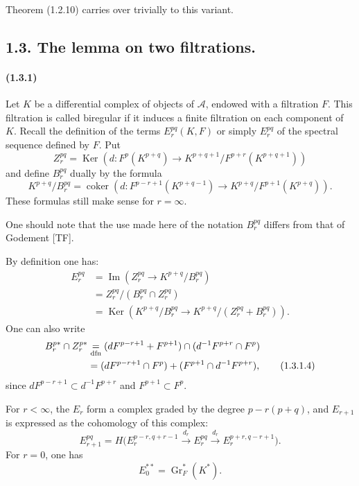 \documentclass[10pt]{article}
\newcommand{\Gr}{\operatorname{Gr}}
\newcommand{\Ker}{\operatorname{Ker}}
\newcommand{\Imop}{\operatorname{Im}}
\newcommand{\coker}{\operatorname{coker}}
\newcommand{\calA}{\mathcal A}
\begin{document}
Theorem (1.2.10) carries over trivially to this variant.

\subsection*{1.3. The lemma on two filtrations.}

\paragraph{(1.3.1)} Let $K$ be a differential complex of objects of $\calA$, endowed with a filtration $F$. This filtration is called biregular if it induces a finite filtration on each component of $K$. Recall the definition of the terms $E_r^{pq}(K,F)$ or simply $E_r^{pq}$ of the spectral sequence defined by $F$. Put
\[
Z_r^{pq}=\Ker\left(d:F^p(K^{p+q})\to K^{p+q+1}/F^{p+r}(K^{p+q+1})\right)
\]
and define $B_r^{pq}$ dually by the formula
\[
K^{p+q}/B_r^{pq}=\coker\left(d:F^{p-r+1}(K^{p+q-1})\to K^{p+q}/F^{p+1}(K^{p+q})\right).
\]
These formulas still make sense for $r=\infty$.

One should note that the use made here of the notation $B_r^{pq}$ differs from that of Godement [TF].

By definition one has:
\begin{align}
E_r^{pq}&=\Imop\left(Z_r^{pq}\to K^{p+q}/B_r^{pq}\right) \tag{1.3.1.1}\\
&=Z_r^{pq}/(B_r^{pq}\cap Z_r^{pq}) \tag{1.3.1.2}\\
&=\Ker\left(K^{p+q}/B_r^{pq}\to K^{p+q}/(Z_r^{pq}+B_r^{pq})\right). \tag{1.3.1.3}
\end{align}
One can also write
\begin{align}
B_r^{p*}\cap Z_r^{p*}
&\underset{\mathrm{dfn}}{=}(dF^{p-r+1}+F^{p+1})\cap(d^{-1}F^{p+r}\cap F^p) \notag\\
&=(dF^{p-r+1}\cap F^p)+(F^{p+1}\cap d^{-1}F^{p+r}), \tag{1.3.1.4}
\end{align}
since $dF^{p-r+1}\subset d^{-1}F^{p+r}$ and $F^{p+1}\subset F^p$.


For $r<\infty$, the $E_r$ form a complex graded by the degree $p-r(p+q)$, and $E_{r+1}$ is expressed as the cohomology of this complex:
\[
\tag{1.3.1.5}
E_{r+1}^{pq}=H\bigl(E_r^{p-r,q+r-1}\xrightarrow{d_r}E_r^{pq}\xrightarrow{d_r}E_r^{p+r,q-r+1}\bigr).
\]
For $r=0$, one has
\[
\tag{1.3.1.6}
E_0^{**}=\Gr_F^*(K^*).
\]
\end{document}
